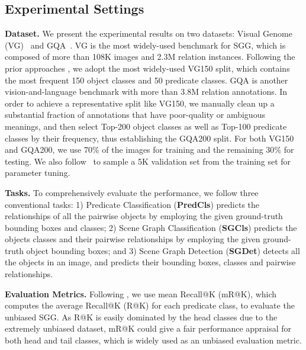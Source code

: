 \documentclass[10pt,twocolumn,letterpaper]{article}
\begin{document}
\subsection{Experimental Settings}
\noindent\textbf{Dataset.}
We present the experimental results on two datasets: Visual Genome (VG)~\cite{krishna2016visual} and GQA~\cite{hudson2019gqa}. VG is the most widely-used benchmark for SGG, which is composed of more than 108K images and 2.3M relation instances. Following the prior approaches \cite{xu2017scene, chen2019knowledge, lin2020gps, yan2020pcpl, zhang2017visual, li2021bipartite, zellers2018neural, tang2019learning, tang2020unbiased, yu2020cogtree, chiou2021recovering, suhail2021energy}, we adopt the most widely-used VG150 split, which contains the most frequent 150 object classes and 50 predicate classes. GQA is another vision-and-language benchmark with more than 3.8M relation annotations. In order to achieve a representative split like VG150, we manually clean up a substantial fraction of annotations that have poor-quality or ambiguous meanings, and then select Top-200 object classes as well as Top-100 predicate classes by their frequency, thus establishing the GQA200 split. For both VG150 and GQA200, we use 70$\%$ of the images for training and the remaining 30$\%$ for testing. We also follow~\cite{zellers2018neural} to sample a 5K validation set from the training set for parameter tuning.

\noindent\textbf{Tasks.}
To comprehensively evaluate the performance, we follow three conventional tasks: 1) Predicate Classification (\textbf{PredCls}) predicts the relationships of all the pairwise objects by employing the given ground-truth bounding boxes and classes; 2) Scene Graph Classification (\textbf{SGCls}) predicts the objects classes and their pairwise relationships by employing the given ground-truth object bounding boxes; and 3) Scene Graph Detection (\textbf{SGDet}) detects all the objects in an image, and predicts their bounding boxes, classes and pairwise relationships.

\noindent\textbf{Evaluation Metrics.} Following \cite{yan2020pcpl, lin2020gps, li2021bipartite, tang2020unbiased, yu2020cogtree, chiou2021recovering, suhail2021energy}, we use mean Recall@K
(mR@K)\cite{tang2019learning,chen2019knowledge}, which computes the average Recall@K (R@K) for each predicate class, to evaluate the unbiased SGG. As R@K is easily dominated by the head classes due to the extremely unbiased dataset, mR@K could give a fair performance appraisal for both head and tail classes, which is widely used as an unbiased evaluation metric.
\end{document}
